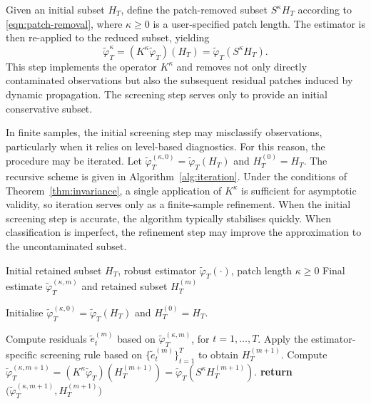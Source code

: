 \documentclass[12pt]{article}
\numberwithin{equation}{section}
\begin{document}
Given an initial subset $H_T$, define the patch-removed subset $S^\kappa H_T$ according to \eqref{eqn:patch-removal}, where $\kappa \ge 0$ is a user-specified patch length. 
The estimator is then re-applied to the reduced subset, yielding
\begin{equation}
\tilde{\varphi}_T^{\kappa}
=
(K^\kappa \tilde{\varphi}_T)(H_T)
=
\tilde{\varphi}_T(S^\kappa H_T).
\end{equation}
This step implements the operator $K^\kappa$ and removes not only directly contaminated observations but also the subsequent residual patches induced by dynamic propagation. 
The screening step serves only to provide an initial conservative subset. 

In finite samples, the initial screening step may misclassify observations, particularly when it relies on level-based diagnostics. 
For this reason, the procedure may be iterated. 
Let $\tilde{\varphi}_T^{(\kappa,0)}=\tilde{\varphi}_T(H_T)$ and $H_T^{(0)}=H_T$. 
The recursive scheme is given in Algorithm~\ref{alg:iteration}. 
Under the conditions of Theorem~\ref{thm:invariance}, a single application of $K^\kappa$ is sufficient for asymptotic validity, so iteration serves only as a finite-sample refinement.
When the initial screening step is accurate, the algorithm typically stabilises quickly. 
When classification is imperfect, the refinement step may improve the approximation to the uncontaminated subset.

\begin{algorithm}
\caption{Iterative feasible patch removal procedure}
\label{alg:iteration}
\begin{algorithmic}[1]
\Require Initial retained subset $H_T$, robust estimator $\tilde{\varphi}_T(\cdot)$, patch length $\kappa \ge 0$
\Ensure Final estimate $\tilde{\varphi}_T^{(\kappa,m)}$ and retained subset $H_T^{(m)}$

\State Initialise $\tilde{\varphi}_T^{(\kappa,0)}=\tilde{\varphi}_T(H_T)$ and $H_T^{(0)}=H_T$.

    \State Compute residuals $\tilde e_t^{(m)}$ based on $\tilde{\varphi}_T^{(\kappa,m)}$, for $t=1,\dots,T$.
    \State Apply the estimator-specific screening rule based on $\{\tilde e_t^{(m)}\}_{t=1}^T$ to obtain $H_T^{(m+1)}$.
    \State Compute $\tilde{\varphi}_T^{(\kappa,m+1)} = (K^\kappa \tilde{\varphi}_T)(H_T^{(m+1)}) = \tilde{\varphi}_T(S^\kappa H_T^{(m+1)})$.
        \State \textbf{return} $\bigl(\tilde{\varphi}_T^{(\kappa,m+1)}, H_T^{(m+1)}\bigr)$
    \EndIf
\EndFor
\end{algorithmic}
\end{algorithm}
\end{document}
